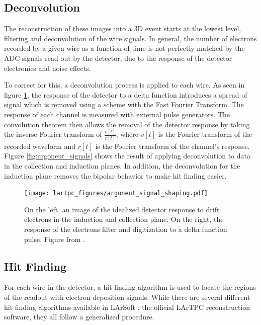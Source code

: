\subsection{Deconvolution}
The reconstruction of these images into a 3D event starts at the lowest level, filtering and deconvolution of the wire signals.  In general, the number of electrons recorded by a given wire as a function of time is not perfectly matched by the ADC signals read out by the detector, due to the response of the detector electronics and noise effects.

To correct for this, a deconvolution process is applied to each wire.  As seen in figure \ref{fig:signal_shaping}, the response of the detector to a delta function introduces a spread of signal which is removed using a scheme with the Fast Fourier Transform. The response of each channel is measured with external pulse generators.  The convolution theorem then allows the removal of the detector response by taking the  inverse Fourier transform of $\frac{v[t]}{r[t]}$, where $v[t]$ is the Fourier transform of the recorded waveform and $r[t]$ is the Fourier transform of the channel's response.  Figure \ref{fig:argoneut_signals} shows the result of applying deconvolution to \argoneut data in the collection and induction planes.  In addition, the deconvolution for the induction plane removes the bipolar behavior to make hit finding easier.

\begin{figure}[htbp]
  \centering
  \texttt{[image: lartpc\_figures/argoneut\_signal\_shaping.pdf]}
  \caption[Signal Shaping in \argoneut]{On the left, an image of the idealized detector response to drift electrons in the induction and collection plane.  On the right, the response of the electrons filter and digitization to a delta function pulse.  Figure from \cite{Anderson:2012vc}.}
  \label{fig:signal_shaping}
\end{figure}


\subsection{Hit Finding}

For each wire in the detector, a hit finding algorithm is used to locate the regions of the readout with electron deposition signals.  While there are several different hit finding algorithms available in LArSoft \cite{Church:2013hea}, the official LArTPC reconstruction software, they all follow a generalized procedure.

